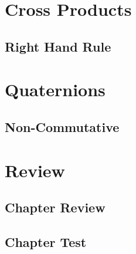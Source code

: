 \section{Cross Products}
\noindent{}
\subsection{Right Hand Rule}

\newpage
\section{Quaternions}
\subsection{Non-Commutative}

\section{Review}
\subsection{Chapter Review}
\subsection{Chapter Test}